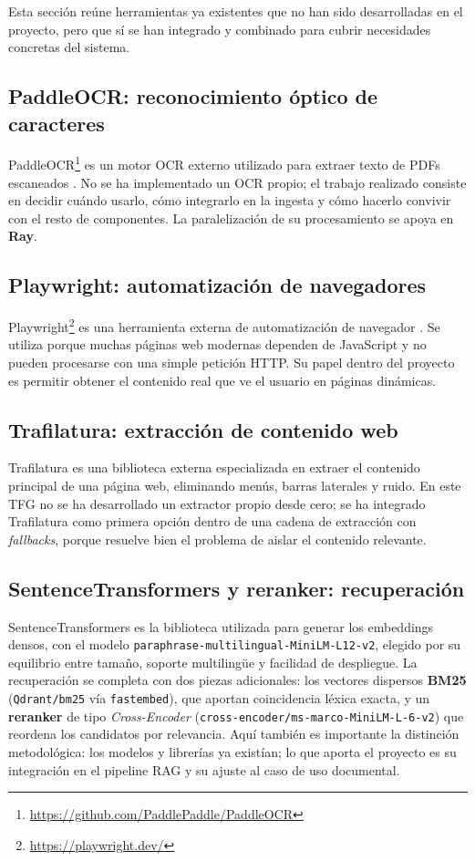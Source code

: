 Esta sección reúne herramientas ya existentes que no han sido desarrolladas en el proyecto, pero que sí se han integrado y combinado para cubrir necesidades concretas del sistema.

\subsection{PaddleOCR: reconocimiento óptico de caracteres}

PaddleOCR\footnote{\url{https://github.com/PaddlePaddle/PaddleOCR}} es un motor OCR externo utilizado para extraer texto de PDFs escaneados \cite{paddleocr2024docs}. No se ha implementado un OCR propio; el trabajo realizado consiste en decidir cuándo usarlo, cómo integrarlo en la ingesta y cómo hacerlo convivir con el resto de componentes. La paralelización de su procesamiento se apoya en \textbf{Ray}.

\subsection{Playwright: automatización de navegadores}

Playwright\footnote{\url{https://playwright.dev/}} es una herramienta externa de automatización de navegador \cite{playwright2024docs}. Se utiliza porque muchas páginas web modernas dependen de JavaScript y no pueden procesarse con una simple petición HTTP. Su papel dentro del proyecto es permitir obtener el contenido real que ve el usuario en páginas dinámicas.

\subsection{Trafilatura: extracción de contenido web}

Trafilatura \cite{barbaresi2021trafilatura} es una biblioteca externa especializada en extraer el contenido principal de una página web, eliminando menús, barras laterales y ruido. En este TFG no se ha desarrollado un extractor propio desde cero; se ha integrado Trafilatura como primera opción dentro de una cadena de extracción con \textit{fallbacks}, porque resuelve bien el problema de aislar el contenido relevante.

\subsection{SentenceTransformers y reranker: recuperación}

SentenceTransformers \cite{reimers2019sentence,sbertDocs} es la biblioteca utilizada para generar los embeddings densos, con el modelo \texttt{paraphrase-multilingual-MiniLM-L12-v2}, elegido por su equilibrio entre tamaño, soporte multilingüe y facilidad de despliegue. La recuperación se completa con dos piezas adicionales: los vectores dispersos \textbf{BM25} (\texttt{Qdrant/bm25} vía \texttt{fastembed}), que aportan coincidencia léxica exacta, y un \textbf{reranker} de tipo \textit{Cross-Encoder} (\texttt{cross-encoder/ms-marco-MiniLM-L-6-v2}) que reordena los candidatos por relevancia. Aquí también es importante la distinción metodológica: los modelos y librerías ya existían; lo que aporta el proyecto es su integración en el pipeline RAG y su ajuste al caso de uso documental.


